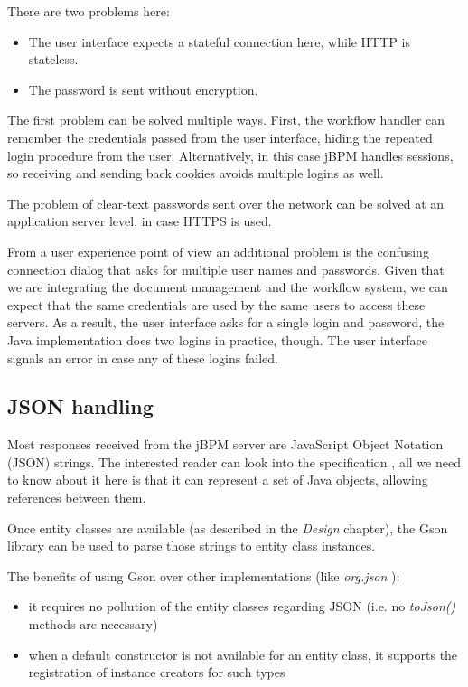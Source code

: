 There are two problems here:

\begin{itemize}
\item The user interface expects a stateful connection here, while HTTP is stateless.
\item The password is sent without encryption.
\end{itemize}

The first problem can be solved multiple ways. First, the workflow handler can
remember the credentials passed from the user interface, hiding the repeated
login procedure from the user. Alternatively, in this case jBPM handles
sessions, so receiving and sending back cookies avoids multiple logins as well.

The problem of clear-text passwords sent over the network can be solved at an
application server level, in case HTTPS is used.

From a user experience point of view an additional problem is the confusing
connection dialog that asks for multiple user names and passwords. Given that
we are integrating the document management and the workflow system, we can
expect that the same credentials are used by the same users to access these
servers. As a result, the user interface asks for a single login and password,
the Java implementation does two logins in practice, though. The user interface
signals an error in case any of these logins failed.

\subsection{JSON handling}

Most responses received from the jBPM server are JavaScript Object Notation
(JSON) strings. The interested reader can look into the
specification \cite{json}, all we need to know about it here is that it can
represent a set of Java objects, allowing references between them.

Once entity classes are available (as described in the \emph{Design} chapter),
the Gson library \cite{gson} can be used to parse those strings to entity class
instances.

The benefits of using Gson over other implementations (like
\emph{org.json} \cite{org-json}):

\begin{itemize}
\item it requires no pollution of the entity classes regarding JSON (i.e. no \emph{toJson()} methods are necessary)
\item when a default constructor is not available for an entity class, it supports the registration of instance creators for such types
\end{itemize}

